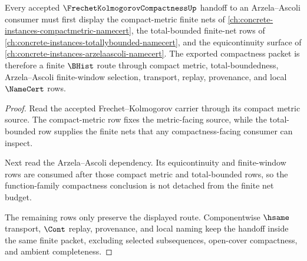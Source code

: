 \begin{theorem}
\label{thm:frechet-kolmogorov-arzela-ascoli-compact-handoff}
Every accepted $\FrechetKolmogorovCompactnessUp$ handoff to an Arzela--Ascoli consumer must first display the compact-metric finite nets of \autoref{ch:concrete-instances-compactmetric-namecert}, the total-bounded finite-net rows of \autoref{ch:concrete-instances-totallybounded-namecert}, and the equicontinuity surface of \autoref{ch:concrete-instances-arzelaascoli-namecert}. The exported compactness packet is therefore a finite $\BHist$ route through compact metric, total-boundedness, Arzela--Ascoli finite-window selection, transport, replay, provenance, and local $\NameCert$ rows.
\end{theorem}
\begin{proof}
Read the accepted Frechet--Kolmogorov carrier through its compact metric source. The compact-metric row fixes the metric-facing source, while the total-bounded row supplies the finite nets that any compactness-facing consumer can inspect.

Next read the Arzela--Ascoli dependency. Its equicontinuity and finite-window rows are consumed after those compact metric and total-bounded rows, so the function-family compactness conclusion is not detached from the finite net budget.

The remaining rows only preserve the displayed route. Componentwise $\hsame$ transport, $\Cont$ replay, provenance, and local naming keep the handoff inside the same finite packet, excluding selected subsequences, open-cover compactness, and ambient completeness.
\end{proof}
